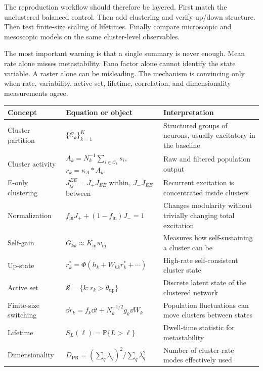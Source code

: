 The reproduction workflow should therefore be layered. First match the unclustered balanced control. Then add clustering and verify up/down structure. Then test finite-size scaling of lifetimes. Finally compare microscopic and mesoscopic models on the same cluster-level observables.

The most important warning is that a single summary is never enough. Mean rate alone misses metastability. Fano factor alone cannot identify the state variable. A raster alone can be misleading. The mechanism is convincing only when rate, variability, active-set, lifetime, correlation, and dimensionality measurements agree.

\begin{chaptersummary}

\begin{center}
\renewcommand{\arraystretch}{1.55}
\begin{tabularx}{\textwidth}{@{}l X X@{}}
  \toprule
  \textbf{Concept} & \textbf{Equation or object} & \textbf{Interpretation} \\
  \midrule
  Cluster partition &
  $\{\mathcal{C}_k\}_{k=1}^{K}$ &
  Structured groups of neurons, usually excitatory in the baseline \\
  Cluster activity &
  $A_k=N_k^{-1}\sum_{i\in\mathcal{C}_k}s_i$, $r_k=\kappa_A*A_k$ &
  Raw and filtered population output \\
  E-only clustering &
  $J_{ij}^{EE}=J_+J_{EE}$ within, $J_-J_{EE}$ between &
  Recurrent excitation is concentrated inside clusters \\
  Normalization &
  $f_{\mathrm{in}}J_+ +(1-f_{\mathrm{in}})J_-=1$ &
  Changes modularity without trivially changing total excitation \\
  Self-gain &
  $G_{kk}\approx K_{\mathrm{in}}w_{\mathrm{in}}$ &
  Measures how self-sustaining a cluster can be \\
  Up-state &
  $r_k^*=\Phi(h_k+W_{kk}r_k^*+\cdots)$ &
  High-rate self-consistent cluster state \\
  Active set &
  $\mathcal{S}=\{k:r_k>\theta_{\mathrm{up}}\}$ &
  Discrete latent state of the clustered network \\
  Finite-size switching &
  $\dd r_k=f_k\dd t+N_k^{-1/2}g_k\dd W_k$ &
  Population fluctuations can move clusters between states \\
  Lifetime &
  $S_L(\ell)=\mathbb{P}\{L>\ell\}$ &
  Dwell-time statistic for metastability \\
  Dimensionality &
  $D_{\mathrm{PR}}=(\sum_q\lambda_q)^2/\sum_q\lambda_q^2$ &
  Number of cluster-rate modes effectively used \\
  \bottomrule
\end{tabularx}
\end{center}

\end{chaptersummary}

